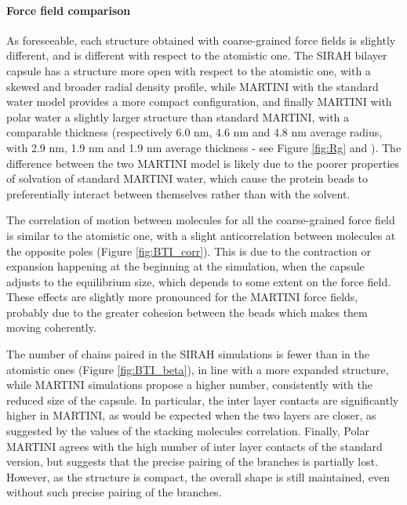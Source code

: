 \paragraph{Force field comparison}
As foreseeable, each structure obtained with coarse-grained force fields is slightly different, and is different with respect to the atomistic one.
%
The SIRAH bilayer capsule has a structure more open with respect to the atomistic one, with a skewed and broader radial density profile, while MARTINI with the standard water model provides a more compact configuration, and finally MARTINI with polar water a slightly larger structure than standard MARTINI, with a comparable thickness (respectively 6.0 nm, 4.6 nm and 4.8 nm average radius, with 2.9 nm, 1.9 nm and 1.9 nm average thickness - see Figure \ref{fig:Rg} and ).
%
The difference between the two MARTINI model is likely due to the poorer properties of solvation of standard MARTINI water, which cause the protein beads to preferentially interact between themselves rather than with the solvent. 

The correlation of motion between molecules for all the coarse-grained force field is similar to the atomistic one, with a slight anticorrelation between molecules at the opposite poles (Figure \ref{fig:BTI_corr}). This is due to the contraction or expansion happening at the beginning at the simulation, when the capsule adjusts to the equilibrium size, which depends to some extent on the force field.
%
These effects are slightly more pronounced for the MARTINI force fields, probably due to the greater cohesion between the beads which makes them moving coherently.

The number of chains paired in the SIRAH simulations is fewer than in the atomistic ones (Figure \ref{fig:BTI_beta}), in line with a more expanded structure, while MARTINI simulations propose a higher number, consistently with the reduced size of the capsule. In particular, the inter layer contacts are significantly higher in MARTINI, as would be expected when the two layers are closer, as suggested by the values of the stacking molecules correlation. Finally, Polar MARTINI agrees with the high number of inter layer contacts of the standard version, but suggests that the precise pairing of the branches is partially lost. However, as the structure is compact, the overall shape is still maintained, even without such precise pairing of the branches.


